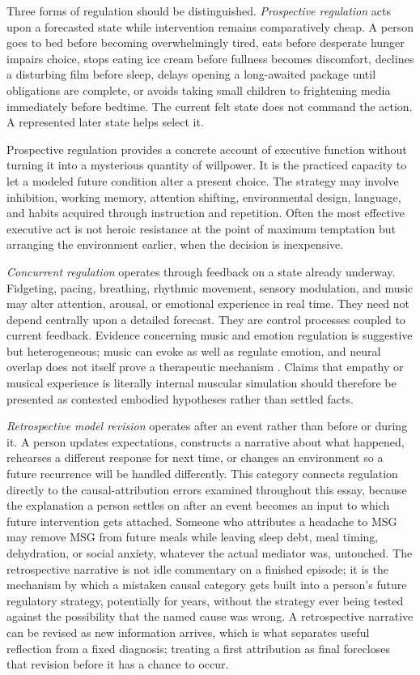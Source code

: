 \documentclass[11pt]{article}
\begin{document}
Three forms of regulation should be distinguished. \emph{Prospective regulation} acts upon a forecasted state while intervention remains comparatively cheap. A person goes to bed before becoming overwhelmingly tired, eats before desperate hunger impairs choice, stops eating ice cream before fullness becomes discomfort, declines a disturbing film before sleep, delays opening a long-awaited package until obligations are complete, or avoids taking small children to frightening media immediately before bedtime. The current felt state does not command the action. A represented later state helps select it.

Prospective regulation provides a concrete account of executive function without turning it into a mysterious quantity of willpower. It is the practiced capacity to let a modeled future condition alter a present choice. The strategy may involve inhibition, working memory, attention shifting, environmental design, language, and habits acquired through instruction and repetition. Often the most effective executive act is not heroic resistance at the point of maximum temptation but arranging the environment earlier, when the decision is inexpensive.

\emph{Concurrent regulation} operates through feedback on a state already underway. Fidgeting, pacing, breathing, rhythmic movement, sensory modulation, and music may alter attention, arousal, or emotional experience in real time. They need not depend centrally upon a detailed forecast. They are control processes coupled to current feedback. Evidence concerning music and emotion regulation is suggestive but heterogeneous; music can evoke as well as regulate emotion, and neural overlap does not itself prove a therapeutic mechanism 
\citep{hou2017music}. Claims that empathy or musical experience is literally internal muscular simulation should therefore be presented as contested embodied hypotheses rather than settled facts.

\emph{Retrospective model revision} operates after an event rather than before or during it. A person updates expectations, constructs a narrative about what happened, rehearses a different response for next time, or changes an environment so a future recurrence will be handled differently. This category connects regulation directly to the causal-attribution errors examined throughout this essay, because the explanation a person settles on after an event becomes an input to which future intervention gets attached. Someone who attributes a headache to MSG may remove MSG from future meals while leaving sleep debt, meal timing, dehydration, or social anxiety, whatever the actual mediator was, untouched. The retrospective narrative is not idle commentary on a finished episode; it is the mechanism by which a mistaken causal category gets built into a person's future regulatory strategy, potentially for years, without the strategy ever being tested against the possibility that the named cause was wrong. A retrospective narrative can be revised as new information arrives, which is what separates useful reflection from a fixed diagnosis; treating a first attribution as final forecloses that revision before it has a chance to occur.
\end{document}
